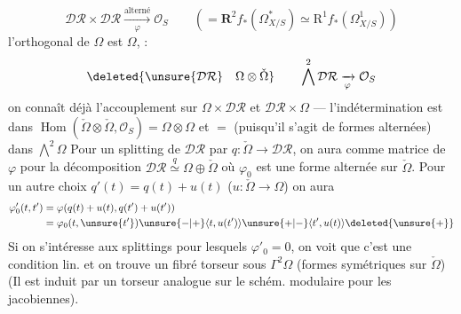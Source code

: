 \[
\mathcal{DR}\times\mathcal{DR}\xrightarrow[\varphi]{\text{alterné}}\mathcal{O}_S
\qquad(=\mathbf{R}^2f_*(\Omega^*_{X/S})\simeq\mathrm{R}^1f_*(\Omega^1_{X/S}))
\]
l'orthogonal de $\Omega$ est $\Omega$, :
\[
\deleted{\unsure{\mathcal{DR}}\quad\Omega\otimes\check\Omega}
\qquad\bigwedge^2\mathcal{DR}\xrightarrow[\varphi]{}\mathcal{O}_S
\]
 on connaît déjà l'accouplement sur $\Omega\times\mathcal{DR}$ et $\mathcal{DR}\times\Omega$ --- l'indétermination est dans \deleted{\unsure{$\Omega$}} $\operatorname{Hom}(\check\Omega\otimes\check\Omega,\mathcal{O}_S)=\Omega\otimes\Omega$ et $=$ (puisqu'il s'agit de formes alternées) dans $\bigwedge^2\Omega$
Pour un splitting de $\mathcal{DR}$ par $q:\check\Omega\to\mathcal{DR}$, on aura comme matrice de $\varphi$ pour la décomposition $\mathcal{DR}\overset{q}{\simeq}\Omega\oplus\check\Omega$
où $\varphi_0$ est une forme alternée sur $\check\Omega$. Pour un autre choix $q'(t)=q(t)+u(t)$ ($u:\check\Omega\to\Omega$) on aura
\[
\begin{aligned}
\varphi'_0(t,t')&=\varphi(q(t)+u(t),q(t')+u(t'))\\
&=\varphi_0(t,\unsure{t'})\unsure{-|+}\langle t,u(t')\rangle\unsure{+|-}\langle t',u(t)\rangle\deleted{\unsure{+}}
\end{aligned}
\]
Si on s'intéresse aux splittings pour lesquels $\varphi'_0=0$, on voit que c'est une condition lin. et on trouve un fibré torseur sous $\Gamma^2\Omega$ (formes symétriques sur $\check\Omega$)
(Il est induit par un torseur analogue sur le schém. modulaire pour les    jacobiennes).


